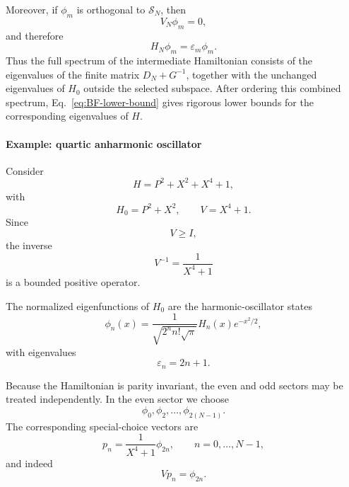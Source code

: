 \documentclass{article}
\theoremstyle{definition}
\begin{document}
Moreover, if \(\phi_m\) is orthogonal to \(\mathcal{S}_N\), then
\begin{equation}
    V_N\phi_m=0,
\end{equation}
and therefore
\begin{equation}
    H_N\phi_m=\varepsilon_m\phi_m .
\end{equation}
Thus the full spectrum of the intermediate Hamiltonian consists of
the eigenvalues of the finite matrix \(D_N+G^{-1}\), together with
the unchanged eigenvalues of \(H_0\) outside the selected subspace.
After ordering this combined spectrum, Eq.~\eqref{eq:BF-lower-bound}
gives rigorous lower bounds for the corresponding eigenvalues of
\(H\).

\paragraph{Example: quartic anharmonic oscillator}

Consider
\begin{equation}
    H
    =
    P^2+X^2+X^4+1 ,
    \label{eq:quartic-H}
\end{equation}
with
\begin{equation}
    H_0=P^2+X^2,
    \qquad
    V=X^4+1 .
\end{equation}
Since
\begin{equation}
    V\geq I,
\end{equation}
the inverse
\begin{equation}
    V^{-1}
    =
    \frac{1}{X^4+1}
\end{equation}
is a bounded positive operator.

The normalized eigenfunctions of \(H_0\) are the harmonic-oscillator
states
\begin{equation}
    \phi_n(x)
    =
    \frac{1}
    {\sqrt{2^n n! \sqrt{\pi}}}
    H_n(x)e^{-x^2/2},
\end{equation}
with eigenvalues
\begin{equation}
    \varepsilon_n=2n+1.
\end{equation}

Because the Hamiltonian is parity invariant, the even and odd
sectors may be treated independently.  In the even sector we choose
\begin{equation}
    \phi_0,\phi_2,\ldots,\phi_{2(N-1)} .
\end{equation}
The corresponding special-choice vectors are
\begin{equation}
    p_n
    =
    \frac{1}{X^4+1}\phi_{2n},
    \qquad
    n=0,\ldots,N-1,
\end{equation}
and indeed
\begin{equation}
    Vp_n=\phi_{2n}.
\end{equation}
\end{document}

